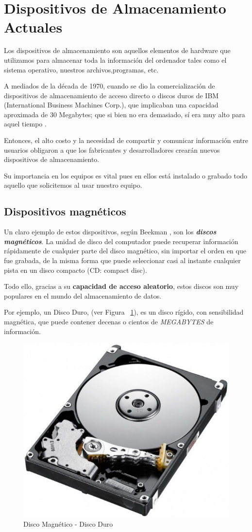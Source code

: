 \documentclass[10pt,journal]{IEEEtran}
\begin{document}
    
    \section{\textbf{Dispositivos de Almacenamiento Actuales}}
    
    Los dispositivos de almacenamiento son aquellos elementos de hardware que
    utilizamos para almacenar toda la información del ordenador tales como el 
    sistema operativo, nuestros archivos,programas, etc.

    A mediados de la década de 1970, cuando se dio la comercialización de dispositivos de almacenamiento de acceso directo o discos duros de IBM (International Business Machines Corp.), que implicaban una capacidad aproximada de 30 Megabytes; que si bien no era demasiado, sí era
    muy alto para aquel tiempo \cite{glossbrenner1993file}.
    
    Entonces, el alto costo y la necesidad de compartir y comunicar información entre usuarios obligaron a que los fabricantes y desarrolladores crearán nuevos dispositivos de almacenamiento.
    
    Su importancia en los equipos es vital pues en ellos está instalado o grabado todo 
    aquello que solicitemos al usar nuestro equipo. 
    
    \subsection{\textbf{Dispositivos magnéticos}}
    
    Un claro ejemplo de estos dispositivos, según Beekman \cite{george1999introduccion}, son los \textbf{\textit{discos magnéticos}}. La unidad de disco del computador puede recuperar información 
    rápidamente de cualquier parte del disco magnético, sin importar el orden en que fue grabada, de la misma forma que puede seleccionar casi al instante cualquier pista en un disco compacto (CD: compact disc).
    
    Todo ello, gracias a su \textbf{capacidad de acceso aleatorio}, estos discos son muy 
    populares en el mundo del almacenamiento de datos.
    
    Por ejemplo, un Disco Duro, (ver Figura  ~\ref{f2}), es un disco rígido, con sensibilidad magnética, que puede contener decenas o cientos de \textit{MEGABYTES} de información.
    
    \begin{figure}[H]
        \begin{center}
        \includegraphics[width=0.25 \textwidth]{Discomagne.jpg}
        \caption{Disco Magnético - Disco Duro}
        \label{f2} 
        \end{center}
    \end{figure}
    
\end{document}

